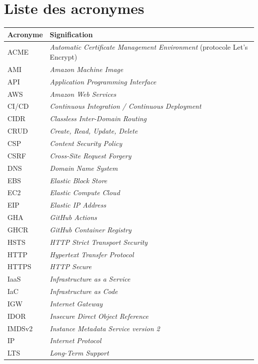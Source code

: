 \chapter*{Liste des acronymes}

\begin{longtable}{p{3cm} p{12cm}}
\toprule
\textbf{Acronyme} & \textbf{Signification} \\
\midrule
\endhead

ACME & \textit{Automatic Certificate Management Environment} (protocole Let's Encrypt) \\
AMI  & \textit{Amazon Machine Image} \\
API  & \textit{Application Programming Interface} \\
AWS  & \textit{Amazon Web Services} \\
CI/CD & \textit{Continuous Integration / Continuous Deployment} \\
CIDR & \textit{Classless Inter-Domain Routing} \\
CRUD & \textit{Create, Read, Update, Delete} \\
CSP  & \textit{Content Security Policy} \\
CSRF & \textit{Cross-Site Request Forgery} \\
DNS  & \textit{Domain Name System} \\
EBS  & \textit{Elastic Block Store} \\
EC2  & \textit{Elastic Compute Cloud} \\
EIP  & \textit{Elastic IP Address} \\
GHA  & \textit{GitHub Actions} \\
GHCR & \textit{GitHub Container Registry} \\
HSTS & \textit{HTTP Strict Transport Security} \\
HTTP & \textit{Hypertext Transfer Protocol} \\
HTTPS & \textit{HTTP Secure} \\
IaaS & \textit{Infrastructure as a Service} \\
IaC  & \textit{Infrastructure as Code} \\
IGW  & \textit{Internet Gateway} \\
IDOR & \textit{Insecure Direct Object Reference} \\
IMDSv2 & \textit{Instance Metadata Service version 2} \\
IP   & \textit{Internet Protocol} \\
LTS  & \textit{Long-Term Support} \\

\end{longtable}
